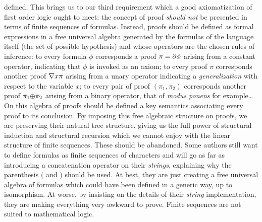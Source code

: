 defined. This brings us to our third requirement which a good
axiomatization of first order logic ought to meet: the concept of
proof {\em should not} be presented in terms of finite sequences of
formulas. Instead, proofs should be defined as formal expressions in
a free universal algebra generated by the formulas of the language
itself (the set of possible hypothesis) and whose operators are the
chosen rules of inference: to every formula $\phi$ corresponds a
proof $\pi=\mbox{$\partial$} \phi$ arising from a constant operator, indicating
that $\phi$ is invoked as an axiom; to every proof $\pi$ corresponds
another proof $\mbox{$\nabla$} x\pi$ arising from a unary operator indicating a
{\em generalization} with respect to the variable $x$; to every pair
of proof $(\pi_{1},\pi_{2})$ corresponds another proof $\pi_{1}\mbox{$\oplus$}
\pi_{2}$ arising from a binary operator, that of {\em modus ponens}
for example\ldots On this algebra of proofs should be defined a key
semantics associating every proof to its conclusion. By imposing
this free algebraic structure on proofs, we are preserving their
natural tree structure, giving us the full power of structural
induction and structural recursion which we cannot enjoy with the
linear structure of finite sequences. These should be abandoned.
Some authors still want to define formulas as finite sequences of
characters and will go as far as introducing a concatenation
operator on their {\em strings}, explaining why the parenthesis $($
and $)$ should be used. At best, they are just creating a free
universal algebra of formulas which could have been defined in a
generic way, up to isomorphism. At worse, by insisting on the
details of their {\em string} implementation, they are making
everything very awkward to prove. Finite sequences are not suited to
mathematical logic.
